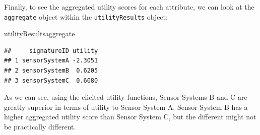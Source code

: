 \documentclass{article}
\makeatletter
\newcommand{\hlkeyword}[1]{\textbf{#1}}%
\newcommand{\hlsymbol}[1]{#1}%
\newenvironment{kframe}{%
 \def\FrameCommand##1{\hskip\@totalleftmargin \hskip-\fboxsep
 \colorbox{shadecolor}{##1}\hskip-\fboxsep
     \hskip-\linewidth \hskip-\@totalleftmargin \hskip\columnwidth}%
 \MakeFramed {\advance\hsize-\width
   \@totalleftmargin\z@ \linewidth\hsize
   \@setminipage}}%
 {\par\unskip\endMakeFramed}
\newenvironment{knitrout}{}{} %
\makeatother
\begin{document}
Finally, to see the aggregated utility scores for each attribute, we can look at the {\tt aggregate} object within the {\tt utilityResults} object:

\begin{knitrout}
\color{fgcolor}\begin{kframe}
\begin{flushleft}
\ttfamily\noindent
\hlsymbol{utilityResults}\hlkeyword{\usebox{\hlnormalsizeboxdollar}}\hlsymbol{aggregate}\mbox{}
\normalfont
\end{flushleft}
\begin{verbatim}
##     signatureID utility
## 1 sensorSystemA -2.3051
## 2 sensorSystemB  0.6205
## 3 sensorSystemC  0.6080
\end{verbatim}
\end{kframe}
\end{knitrout}


As we can see, using the elicited utility functions, Sensor Systems B and C are greatly superior
in terms of utility to Sensor System A. Sensor System B has a higher aggregated utility score than
Sensor System C, but the different might not be practically different.
\end{document}
